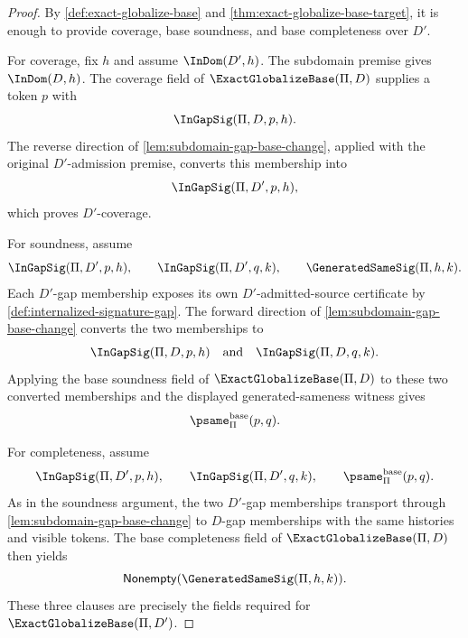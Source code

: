 \begin{proof}
By \autoref{def:exact-globalize-base} and \autoref{thm:exact-globalize-base-target}, it is enough to provide coverage, base soundness, and base completeness over $D'$.

For coverage, fix $h$ and assume $\InDom(D',h)$. The subdomain premise gives $\InDom(D,h)$. The coverage field of $\ExactGlobalizeBase(\Pi,D)$ supplies a token $p$ with
$$
  \InGapSig(\Pi,D,p,h).
$$
The reverse direction of \autoref{lem:subdomain-gap-base-change}, applied with the original $D'$-admission premise, converts this membership into
$$
  \InGapSig(\Pi,D',p,h),
$$
which proves $D'$-coverage.

For soundness, assume
$$
  \InGapSig(\Pi,D',p,h),
  \qquad
  \InGapSig(\Pi,D',q,k),
  \qquad
  \GeneratedSameSig(\Pi,h,k).
$$
Each $D'$-gap membership exposes its own $D'$-admitted-source certificate by \autoref{def:internalized-signature-gap}. The forward direction of \autoref{lem:subdomain-gap-base-change} converts the two memberships to
$$
  \InGapSig(\Pi,D,p,h)
  \quad\text{and}\quad
  \InGapSig(\Pi,D,q,k).
$$
Applying the base soundness field of $\ExactGlobalizeBase(\Pi,D)$ to these two converted memberships and the displayed generated-sameness witness gives
$$
  \psame_{\Pi}^{\mathrm{base}}(p,q).
$$

For completeness, assume
$$
  \InGapSig(\Pi,D',p,h),
  \qquad
  \InGapSig(\Pi,D',q,k),
  \qquad
  \psame_{\Pi}^{\mathrm{base}}(p,q).
$$
As in the soundness argument, the two $D'$-gap memberships transport through \autoref{lem:subdomain-gap-base-change} to $D$-gap memberships with the same histories and visible tokens. The base completeness field of $\ExactGlobalizeBase(\Pi,D)$ then yields
$$
  \mathsf{Nonempty}(\GeneratedSameSig(\Pi,h,k)).
$$
These three clauses are precisely the fields required for $\ExactGlobalizeBase(\Pi,D')$.
\end{proof}
